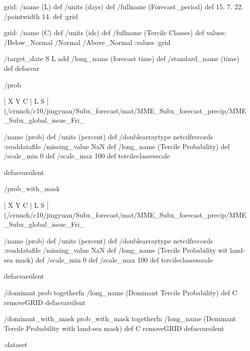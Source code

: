 \begin{ingrid}
grid:
/name (L) def
/units (days) def
/fullname (Forecast_period) def
15. 7. 22.
/pointwidth 14. def
:grid

grid:
/name (C) def
/units (ids) def
/fullname (Tercile Classes) def
values: /Below_Normal /Normal /Above_Normal :values
:grid

/target_date { S L add /long_name (forecast time) def /standard_name (time) def } defasvar

/prob {

[ X Y C | L S ] (/crunch/c10/jingyuan/Subx_forecast/mat/MME_Subx_forecast_precip/MME_Subx_global_issue_Fri_%

/name (prob) def
/units (percent) def
/doublearraytype netcdfrecords :readdatafile
/missing_value NaN def
/long_name (Tercile Probability) def
/scale_min 0 def
/scale_max 100 def
tercileclassesscale
} defasvarsilent


/prob_with_mask {

[ X Y C | L S ] (/crunch/c10/jingyuan/Subx_forecast/mat/MME_Subx_forecast_precip/MME_Subx_global_issue_Fri_%

/name (prob) def
/units (percent) def
/doublearraytype netcdfrecords :readdatafile
/missing_value NaN def
/long_name (Tercile Probability wit land-sea mask) def
/scale_min 0 def
/scale_max 100 def
tercileclassesscale
} defasvarsilent


/dominant {
prob togetherfn
/long_name (Dominant Tercile Probability) def
C removeGRID
} defasvarsilent


/dominant_with_mask {
prob_with_mask togetherfn
/long_name (Dominant Tercile Probability with land-sea mask) def
C removeGRID
} defasvarsilent


:dataset
\end{ingrid}
